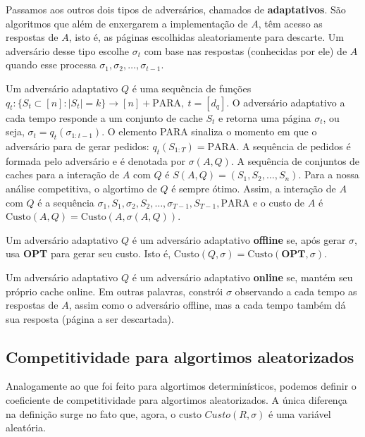 Passamos aos outros dois tipos de adversários, chamados de \textbf{adaptativos}. São algoritmos que além de enxergarem a implementação de \(A\), têm acesso as respostas de \(A\), isto é, as páginas escolhidas aleatoriamente para descarte. Um adversário desse tipo escolhe \(\sigma_t\) com base nas respostas (conhecidas por ele) de \(A\) quando esse processa \(\sigma_1, \sigma_2, \dots, \sigma_{t-1}\).

Um adversário adaptativo \(Q\) é uma sequência de funções \(q_t : \{S_t \subset [n] : |S_t| = k\} \to [n] + {\text{PARA}}, \ t = [d_q]\). O adversário adaptativo a cada tempo responde a um conjunto de cache $S_t$ e retorna uma página \(\sigma_t\), ou seja, \(\sigma_t = q_t(\sigma_{1:t-1})\). O elemento PARA sinaliza o momento em que o adversário para de gerar pedidos: \(q_t(S_{1:T}) = \text{PARA}\). A sequência de pedidos é formada pelo adversário e é denotada por \(\sigma(A,Q)\). A sequência de conjuntos de caches para a interação de \(A\) com \(Q\) é \(S(A,Q) = (S_1, S_2, \dots, S_n)\). Para a nossa análise competitiva, o algortimo de \(Q\) é sempre ótimo. Assim, a interação de \(A\) com \(Q\) é a sequência \(\sigma_1, S_1, \sigma_2, S_2, \dots, \sigma_{T-1}, S_{T-1}, \text{PARA}\) e o custo de \(A\) é \(\text{Custo}(A, Q) = \text{Custo}(A, \sigma(A, Q))\).

\begin{definition}
  Um adversário adaptativo \(Q\) é um adversário adaptativo \textbf{offline} se, após gerar \(\sigma\), usa \textbf{OPT} para gerar seu custo. Isto é, Custo\((Q, \sigma) = \text{Custo}(\textbf{OPT}, \sigma)\).
\end{definition}

\begin{definition}
  Um adversário adaptativo \(Q\) é um adversário adaptativo \textbf{online} se, mantém seu próprio cache online. Em outras palavras, constrói \(\sigma\) observando a cada tempo as respostas de \(A\), assim como o adversário offline, mas a cada tempo também dá sua resposta (página a ser descartada). 
\end{definition}

\subsection{Competitividade para algortimos aleatorizados}

Analogamente ao que foi feito para algortimos determinísticos, podemos definir o coeficiente de competitividade para algortimos aleatorizados. A única diferença na definição surge no fato que, agora, o custo \(Custo(R, \sigma)\) é uma variável aleatória.

